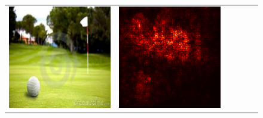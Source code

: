 \documentclass[preprint,12pt]{elsarticle}
\begin{document}
\begin{figure}[p]
\begin{tabular}{cccccc}
  \includegraphics[scale=\scale]{../visualizations/examples/imagenette/resnet18/images/5.png} &
  \includegraphics[scale=\scale]{../visualizations/examples/imagenette/resnet18/saliency_map/5.png} & 

\end{tabular}
\end{figure}
\end{document}
